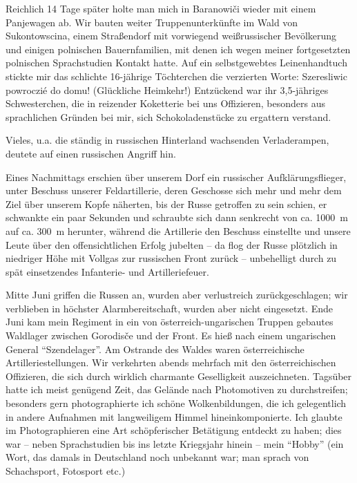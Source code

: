 Reichlich 14 Tage später holte man mich in Baranowiči wieder mit einem Panjewagen ab. Wir bauten weiter Truppenunterkünfte im Wald von Sukontowscina, einem Straßendorf mit vorwiegend weißrussischer Bevölkerung und einigen polnischen Bauernfamilien, mit denen ich wegen meiner fortgesetzten polnischen Sprachstudien Kontakt hatte. Auf ein selbstgewebtes Leinenhandtuch stickte mir das schlichte 16-jährige Töchterchen die verzierten Worte: Szeresliwic powroczié do domu! (Glückliche Heimkehr!) Entzückend war ihr 3,5-jähriges Schwesterchen, die in reizender Koketterie bei uns Offizieren, besonders aus sprachlichen Gründen bei mir, sich Schokoladenstücke zu ergattern verstand.

Vieles, u.a. die ständig in russischen Hinterland wachsenden Verladerampen, deutete auf einen russischen Angriff hin.

Eines Nachmittags erschien über unserem Dorf ein russischer Aufklärungsflieger, unter Beschuss unserer Feldartillerie, deren Geschosse sich mehr und mehr dem Ziel über unserem Kopfe näherten, bis der Russe getroffen zu sein schien, er schwankte ein paar Sekunden und schraubte sich dann senkrecht von ca. 1000~m auf ca. 300~m herunter, während die Artillerie den Beschuss einstellte und unsere Leute über den offensichtlichen Erfolg jubelten -- da flog der Russe plötzlich in niedriger Höhe mit Vollgas zur russischen Front zurück -- unbehelligt durch zu spät einsetzendes Infanterie- und Artilleriefeuer.

Mitte Juni griffen die Russen an, wurden aber verlustreich zurückgeschlagen; wir verblieben in höchster Alarmbereitschaft, wurden aber nicht eingesetzt. Ende Juni kam mein Regiment in ein von österreich-ungarischen Truppen gebautes Waldlager zwischen Gorodisče und der Front. Es hieß nach einem ungarischen General \enquote{Szendelager}. Am Ostrande des Waldes waren österreichische Artilleriestellungen. Wir verkehrten abends mehrfach mit den österreichischen Offizieren, die sich durch wirklich charmante Geselligkeit auszeichneten. Tagsüber hatte ich meist genügend Zeit, das Gelände nach Photomotiven zu durchstreifen; besonders gern photographierte ich schöne Wolkenbildungen, die ich gelegentlich in andere Aufnahmen mit langweiligem Himmel hineinkomponierte. Ich glaubte im Photographieren eine Art schöpferischer Betätigung entdeckt zu haben; dies war -- neben Sprachstudien bis ins letzte Kriegsjahr hinein -- mein \enquote{Hobby} (ein Wort, das damals in Deutschland noch unbekannt war; man sprach von Schachsport, Fotosport etc.)


